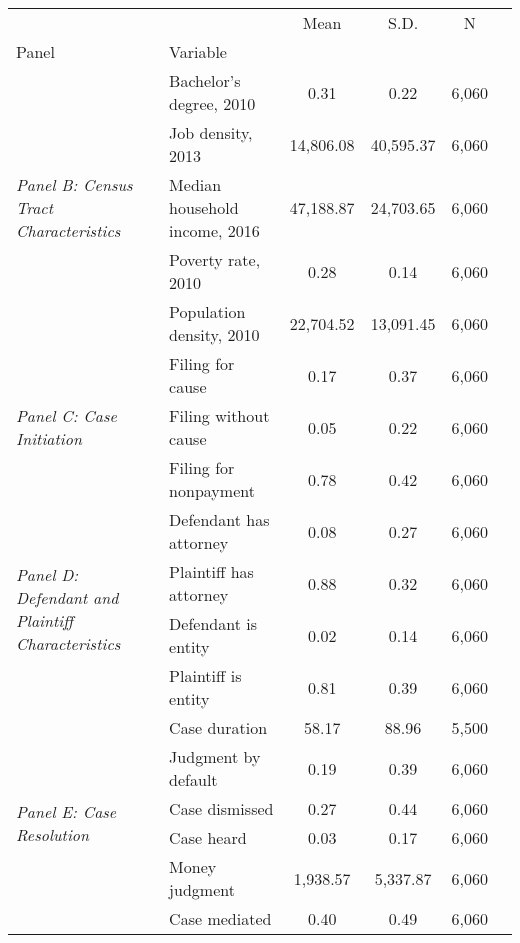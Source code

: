 \begin{tabular}{llcccc}
\toprule
 &  & Mean & S.D. & N \\
Panel & Variable &  &  &  \\
\midrule
\multirow[c]{5}{4cm}{\textit{Panel B: Census Tract Characteristics}} & Bachelor's degree, 2010 & 0.31 & 0.22 & 6,060 \\
 & Job density, 2013 & 14,806.08 & 40,595.37 & 6,060 \\
 & Median household income, 2016 & 47,188.87 & 24,703.65 & 6,060 \\
 & Poverty rate, 2010 & 0.28 & 0.14 & 6,060 \\
 & Population density, 2010 & 22,704.52 & 13,091.45 & 6,060 \\
\cline{1-5}
\multirow[c]{3}{4cm}{\textit{Panel C: Case Initiation}} & Filing for cause & 0.17 & 0.37 & 6,060 \\
 & Filing without cause & 0.05 & 0.22 & 6,060 \\
 & Filing for nonpayment & 0.78 & 0.42 & 6,060 \\
\cline{1-5}
\multirow[c]{4}{4cm}{\textit{Panel D: Defendant and Plaintiff Characteristics}} & Defendant has attorney & 0.08 & 0.27 & 6,060 \\
 & Plaintiff has attorney & 0.88 & 0.32 & 6,060 \\
 & Defendant is entity & 0.02 & 0.14 & 6,060 \\
 & Plaintiff is entity & 0.81 & 0.39 & 6,060 \\
\cline{1-5}
\multirow[c]{6}{4cm}{\textit{Panel E: Case Resolution}} & Case duration & 58.17 & 88.96 & 5,500 \\
 & Judgment by default & 0.19 & 0.39 & 6,060 \\
 & Case dismissed & 0.27 & 0.44 & 6,060 \\
 & Case heard & 0.03 & 0.17 & 6,060 \\
 & Money judgment & 1,938.57 & 5,337.87 & 6,060 \\
 & Case mediated & 0.40 & 0.49 & 6,060 \\
\cline{1-5}
\bottomrule
\end{tabular}
